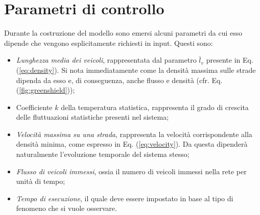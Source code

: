 \section{Parametri di controllo}
Durante la costruzione del modello sono emersi alcuni parametri da cui esso dipende che vengono esplicitamente richiesti in input.
Questi sono:
\begin{itemize}
    \item \emph{Lunghezza media dei veicoli}, rappresentata dal parametro $\bar{l}_v$ presente in Eq. (\ref{eq:density}).
        Si nota immediatamente come la densit\`a massima sulle strade dipenda da esso e, di conseguenza, anche flusso e densit\`a (cfr. Eq. (\ref{fig:greenshield}));
    \item Coefficiente $k$ della temperatura statistica, rappresenta il grado di crescita delle fluttuazioni statistiche presenti nel sistema;
    \item \emph{Velocit\`a massima su una strada}, rappresenta la velocit\`a corrispondente alla densit\`a minima, come espresso in Eq. (\ref{eq:velocity}).
        Da questa dipender\`a naturalmente l'evoluzione temporale del sistema stesso;
    \item \emph{Flusso di veicoli immessi}, ossia il numero di veicoli immessi nella rete per unit\`a di tempo;
    \item \emph{Tempo di esecuzione}, il quale deve essere impostato in base al tipo di fenomeno che si vuole osservare.
\end{itemize}